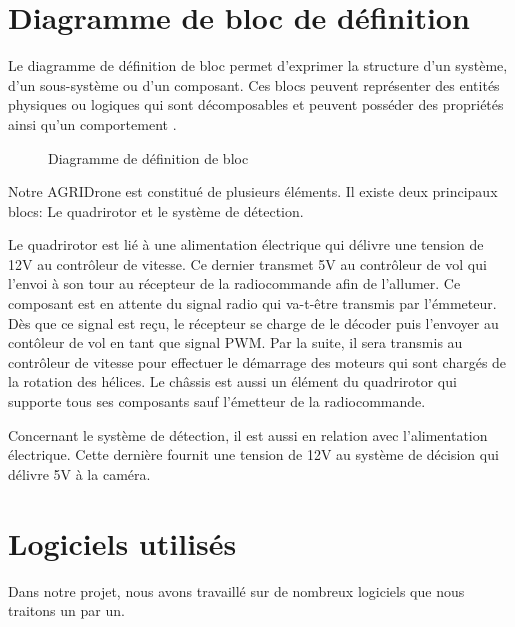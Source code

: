 	\section[D.définition de bloc]{Diagramme de bloc de définition  }
	
Le diagramme de définition de bloc permet d'exprimer la structure d'un système, d'un sous-système ou d'un composant. Ces blocs peuvent représenter des entités physiques ou logiques qui sont décomposables et peuvent posséder des propriétés ainsi qu'un comportement \cite{siloged}.


\begin{figure}[H] 
	\begin{center} 
		\centering
		\hspace*{-3.4cm}	
	\end{center}
	
	\caption{Diagramme de définition de bloc}
	
	\end {figure}
	Notre AGRIDrone  est constitué de plusieurs éléments. Il existe deux principaux blocs: Le quadrirotor et le système de détection.
	
	Le quadrirotor est lié à une alimentation électrique qui  délivre une tension de 12V au contrôleur de vitesse. Ce dernier transmet 5V au contrôleur de vol qui l'envoi à son tour au récepteur de la radiocommande afin de l'allumer. Ce composant est en attente du signal radio qui va-t-être transmis par l'émmeteur. Dès que ce signal est reçu, le récepteur se charge de le décoder puis l'envoyer au contôleur de vol en tant que signal PWM. Par la suite, il sera transmis au contrôleur de vitesse pour effectuer le démarrage des moteurs qui sont chargés de la rotation des hélices. Le châssis est aussi un élément du quadrirotor qui supporte tous ses composants sauf l'émetteur de la radiocommande.
	
	Concernant le système de détection, il est aussi en relation avec l'alimentation électrique. Cette dernière fournit une tension de 12V au système de décision qui délivre 5V à la caméra.
	\section{Logiciels utilisés}
	Dans notre projet, nous avons travaillé sur de nombreux logiciels que nous traitons un par un.
